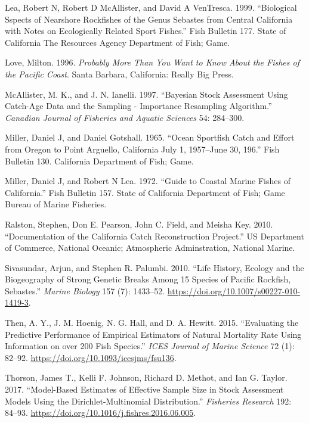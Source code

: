 \documentclass[11pt,
  english,
  a4paper,
]{article}
\begin{document}
\begin{cslreferences}
\leavevmode\hypertarget{ref-lea_biological_1999}{}%
Lea, Robert N, Robert D McAllister, and David A VenTresca. 1999. ``Biological Sspects of Nearshore Rockfishes of the Genus Sebastes from Central California with Notes on Ecologically Related Sport Fishes.'' Fish Bulletin 177. State of California The Resources Agency Department of Fish; Game.

\leavevmode\hypertarget{ref-love_milton_probably_1996}{}%
Love, Milton. 1996. \emph{Probably More Than You Want to Know About the Fishes of the Pacific Coast}. Santa Barbara, California: Really Big Press.

\leavevmode\hypertarget{ref-mcallister_bayesian_1997}{}%
McAllister, M. K., and J. N. Ianelli. 1997. ``Bayesian Stock Assessment Using Catch-Age Data and the Sampling - Importance Resampling Algorithm.'' \emph{Canadian Journal of Fisheries and Aquatic Sciences} 54: 284--300.

\leavevmode\hypertarget{ref-miller_ocean_1965}{}%
Miller, Daniel J, and Daniel Gotshall. 1965. ``Ocean Sportfish Catch and Effort from Oregon to Point Arguello, California July 1, 1957--June 30, 196.'' Fish Bulletin 130. California Department of Fish; Game.

\leavevmode\hypertarget{ref-miller_guide_1972}{}%
Miller, Daniel J, and Robert N Lea. 1972. ``Guide to Coastal Marine Fishes of California.'' Fish Bulletin 157. State of California Department of Fish; Game Bureau of Marine Fisheries.

\leavevmode\hypertarget{ref-ralston_documentation_2010}{}%
Ralston, Stephen, Don E. Pearson, John C. Field, and Meisha Key. 2010. ``Documentation of the California Catch Reconstruction Project.'' US Department of Commerce, National Oceanic; Atmospheric Adminstration, National Marine.

\leavevmode\hypertarget{ref-sivasundar_life_2010}{}%
Sivasundar, Arjun, and Stephen R. Palumbi. 2010. ``Life History, Ecology and the Biogeography of Strong Genetic Breaks Among 15 Species of Pacific Rockfish, Sebastes.'' \emph{Marine Biology} 157 (7): 1433--52. \url{https://doi.org/10.1007/s00227-010-1419-3}.

\leavevmode\hypertarget{ref-then_evaluating_2015-1}{}%
Then, A. Y., J. M. Hoenig, N. G. Hall, and D. A. Hewitt. 2015. ``Evaluating the Predictive Performance of Empirical Estimators of Natural Mortality Rate Using Information on over 200 Fish Species.'' \emph{ICES Journal of Marine Science} 72 (1): 82--92. \url{https://doi.org/10.1093/icesjms/fsu136}.

\leavevmode\hypertarget{ref-thorson_model-based_2017}{}%
Thorson, James T., Kelli F. Johnson, Richard D. Methot, and Ian G. Taylor. 2017. ``Model-Based Estimates of Effective Sample Size in Stock Assessment Models Using the Dirichlet-Multinomial Distribution.'' \emph{Fisheries Research} 192: 84--93. \url{https://doi.org/10.1016/j.fishres.2016.06.005}.
\end{cslreferences}
\end{document}
